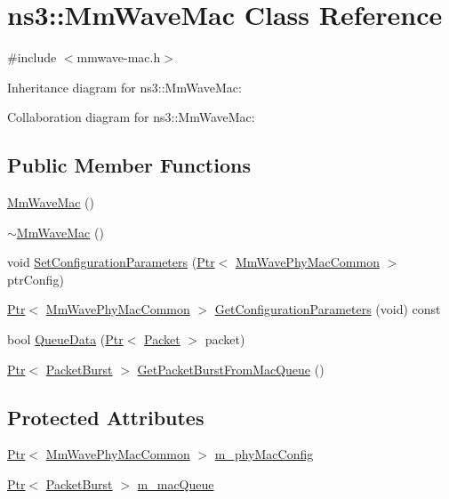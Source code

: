 \hypertarget{classns3_1_1MmWaveMac}{}\section{ns3\+:\+:Mm\+Wave\+Mac Class Reference}
\label{classns3_1_1MmWaveMac}


{\ttfamily \#include $<$mmwave-\/mac.\+h$>$}



Inheritance diagram for ns3\+:\+:Mm\+Wave\+Mac\+:


Collaboration diagram for ns3\+:\+:Mm\+Wave\+Mac\+:
\subsection*{Public Member Functions}
\begin{DoxyCompactItemize}
\item 
\hyperlink{classns3_1_1MmWaveMac_a94a7b9ac146613e83c13dc6eb6012d18}{Mm\+Wave\+Mac} ()
\item 
\hyperlink{classns3_1_1MmWaveMac_a98dc4dce09cfacaa57165129e97dc74e}{$\sim$\+Mm\+Wave\+Mac} ()
\item 
void \hyperlink{classns3_1_1MmWaveMac_a1f4cb5e63523b2147106657804949392}{Set\+Configuration\+Parameters} (\hyperlink{classns3_1_1Ptr}{Ptr}$<$ \hyperlink{classns3_1_1MmWavePhyMacCommon}{Mm\+Wave\+Phy\+Mac\+Common} $>$ ptr\+Config)
\item 
\hyperlink{classns3_1_1Ptr}{Ptr}$<$ \hyperlink{classns3_1_1MmWavePhyMacCommon}{Mm\+Wave\+Phy\+Mac\+Common} $>$ \hyperlink{classns3_1_1MmWaveMac_a602a9c22eeb3be73e37bc755067ff872}{Get\+Configuration\+Parameters} (void) const 
\item 
bool \hyperlink{classns3_1_1MmWaveMac_a2ed04fd92d5187e642114469c710c94b}{Queue\+Data} (\hyperlink{classns3_1_1Ptr}{Ptr}$<$ \hyperlink{classns3_1_1Packet}{Packet} $>$ packet)
\item 
\hyperlink{classns3_1_1Ptr}{Ptr}$<$ \hyperlink{classns3_1_1PacketBurst}{Packet\+Burst} $>$ \hyperlink{classns3_1_1MmWaveMac_a2672616548081002985a9d639d0beee7}{Get\+Packet\+Burst\+From\+Mac\+Queue} ()
\end{DoxyCompactItemize}
\subsection*{Protected Attributes}
\begin{DoxyCompactItemize}
\item 
\hyperlink{classns3_1_1Ptr}{Ptr}$<$ \hyperlink{classns3_1_1MmWavePhyMacCommon}{Mm\+Wave\+Phy\+Mac\+Common} $>$ \hyperlink{classns3_1_1MmWaveMac_ab443a6adc0e206779d6c2edeacb3ae0d}{m\+\_\+phy\+Mac\+Config}
\item 
\hyperlink{classns3_1_1Ptr}{Ptr}$<$ \hyperlink{classns3_1_1PacketBurst}{Packet\+Burst} $>$ \hyperlink{classns3_1_1MmWaveMac_a0e912cf2d226bb57e4179ae3de7636c7}{m\+\_\+mac\+Queue}
\end{DoxyCompactItemize}
